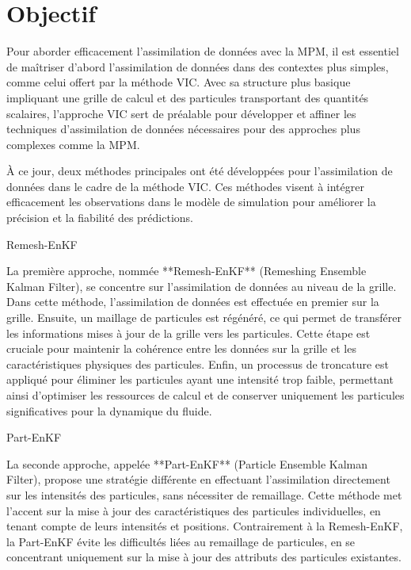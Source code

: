 \section{Objectif}

Pour aborder efficacement l'assimilation de données avec la MPM, il est essentiel de maîtriser d'abord l'assimilation de données dans des contextes plus simples, comme celui offert par la méthode VIC. Avec sa structure plus basique impliquant une grille de calcul et des particules transportant des quantités scalaires, l'approche VIC sert de préalable pour développer et affiner les techniques d'assimilation de données nécessaires pour des approches plus complexes comme la MPM.

À ce jour, deux méthodes principales ont été développées pour l'assimilation de données dans le cadre de la méthode VIC. Ces méthodes visent à intégrer efficacement les observations dans le modèle de simulation pour améliorer la précision et la fiabilité des prédictions.


Remesh-EnKF

La première approche, nommée **Remesh-EnKF** (Remeshing Ensemble Kalman Filter), se concentre sur l'assimilation de données au niveau de la grille. Dans cette méthode, l'assimilation de données est effectuée en premier sur la grille. Ensuite, un maillage de particules est régénéré, ce qui permet de transférer les informations mises à jour de la grille vers les particules. Cette étape est cruciale pour maintenir la cohérence entre les données sur la grille et les caractéristiques physiques des particules. Enfin, un processus de troncature est appliqué pour éliminer les particules ayant une intensité trop faible, permettant ainsi d'optimiser les ressources de calcul et de conserver uniquement les particules significatives pour la dynamique du fluide.

Part-EnKF

La seconde approche, appelée **Part-EnKF** (Particle Ensemble Kalman Filter), propose une stratégie différente en effectuant l'assimilation directement sur les intensités des particules, sans nécessiter de remaillage. Cette méthode met l'accent sur la mise à jour des caractéristiques des particules individuelles, en tenant compte de leurs intensités et positions. Contrairement à la Remesh-EnKF, la Part-EnKF évite les difficultés liées au remaillage de particules, en se concentrant uniquement sur la mise à jour des attributs des particules existantes.
